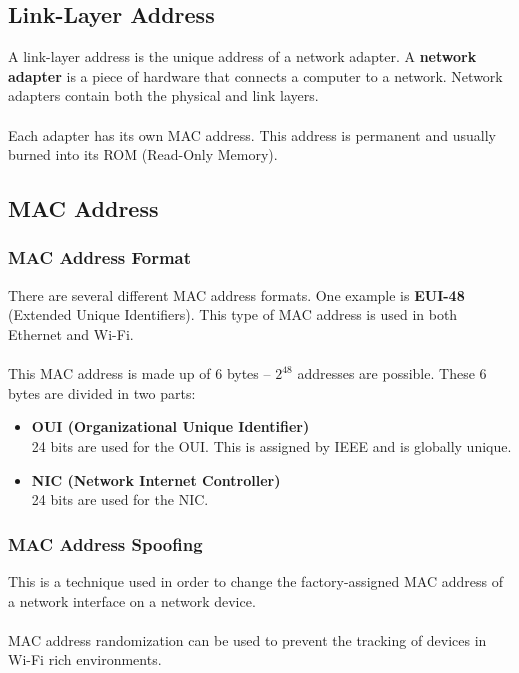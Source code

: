 \documentclass{article}
\begin{document}
\subsection{Link-Layer Address}
A link-layer address is the unique address of a network adapter. A \textbf{network adapter} is a piece of hardware that connects a computer to a network. Network adapters contain both the physical and link layers. \\ \\
Each adapter has its own MAC address. This address is permanent and usually burned into its ROM (Read-Only Memory).

\subsection{MAC Address}
\subsubsection{MAC Address Format}
There are several different MAC address formats. One example is \textbf{EUI-48} (Extended Unique Identifiers). This type of MAC address is used in both Ethernet and Wi-Fi. \\ \\
This MAC address is made up of 6 bytes -- $2^48$ addresses are possible. These 6 bytes are divided in two parts:

\begin{itemize}
	\item \textbf{OUI (Organizational Unique Identifier)}
	\vspace{.2cm} \\
	24 bits are used for the OUI. This is assigned by IEEE and is globally unique.
	
	\item  \textbf{NIC (Network Internet Controller)}
	\vspace{.2cm} \\
	24 bits are used for the NIC.
\end{itemize}

\subsubsection{MAC Address Spoofing}
This is a technique used in order to change the factory-assigned MAC address of a network interface on a network device. \\ \\
MAC address randomization can be used to prevent the tracking of devices in Wi-Fi rich environments.
\end{document}
